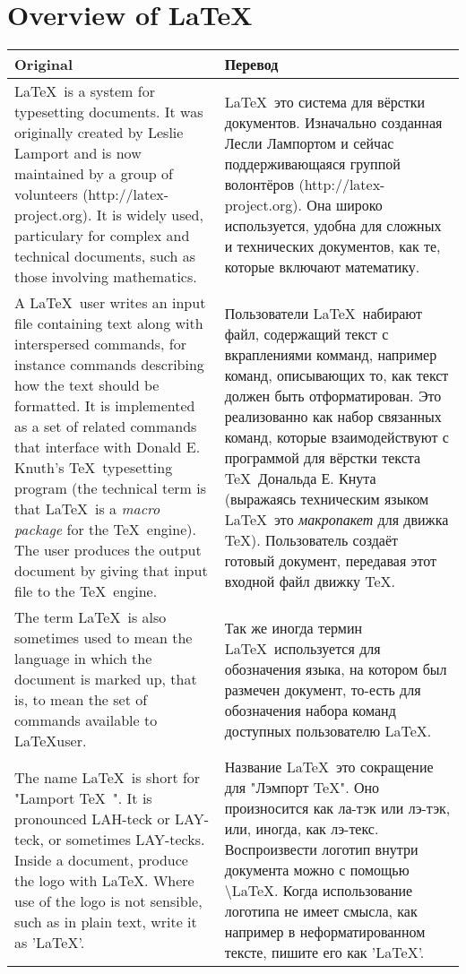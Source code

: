 \documentclass[a4paper]{book}
\begin{document}
\chapter{Overview of \LaTeX}

\begin{longtable}{p{7.5cm}|p{7.5cm}}
\hline
  Original & Перевод \\
\hline

\LaTeX\ is a system for typesetting documents. It was originally created by Leslie Lamport and is now maintained by a group of volunteers (http://latex-project.org). It is widely used, particulary for complex and technical documents, such as those involving mathematics.
&
\LaTeX\ это система для вёрстки документов. Изначально созданная Лесли Лампортом и сейчас поддерживающаяся группой волонтёров (http://latex-project.org). Она широко используется, удобна для сложных и технических документов, как те, которые включают математику.

\\

A \LaTeX\ user writes an input file containing text along with interspersed commands, for instance commands describing how the text should be formatted. It is implemented as a set of related commands that interface with Donald E. Knuth's \TeX\ typesetting program (the technical term is that \LaTeX\ is a \textit{macro package} for the \TeX\ engine). The user produces the output document by giving that input file to the \TeX\ engine.
&
Пользователи \LaTeX\ набирают файл, содержащий текст с вкраплениями комманд, например команд, описывающих то, как текст должен быть отформатирован. Это реализованно как набор связанных команд, которые взаимодействуют с программой для вёрстки текста \TeX\ Дональда Е. Кнута (выражаясь техническим языком \LaTeX\ это \textit{макропакет} для движка \TeX). Пользователь создаёт готовый документ, передавая этот входной файл движку \TeX.
\\
The term \LaTeX\ is also sometimes used to mean the language in which the document is marked up, that is, to mean the set of commands available to \LaTeX user.
&
Так же иногда термин \LaTeX\ используется для обозначения языка, на котором был размечен документ, то-есть для обозначения набора команд доступных пользователю \LaTeX.
\\
The name \LaTeX\ is short for "Lamport \TeX\ ". It is pronounced LAH-teck or LAY-teck, or sometimes LAY-tecks. Inside a document, produce the logo with \LaTeX. Where use of the logo is not sensible, such as in plain text, write it as 'LaTeX'.
&
Название \LaTeX\ это сокращение для "Лэмпорт \TeX". Оно произносится как ла-тэк или лэ-тэк, или, иногда, как лэ-текс. Воспроизвести логотип внутри документа можно с помощью \textbackslash LaTeX. Когда использование логотипа не имеет смысла, как например в неформатированном тексте, пишите его как 'LaTeX'.
\end{longtable}
\end{document}
